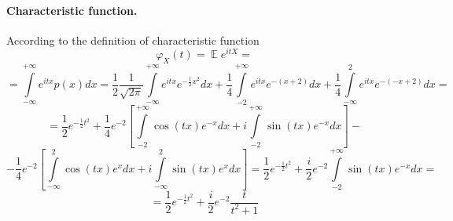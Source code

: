 \documentclass[a4paper, 12pt]{article}
\DeclareMathOperator*{\E}{\mathbb{E}}
\begin{document}
\paragraph{Characteristic function.}
According to the definition of characteristic function
$$
\varphi_X(t) = \E e^{itX} = 
$$
$$
= \int \limits_{- \infty}^{+\infty} e^{itx} p(x) dx = \dfrac{1}{2} \dfrac{1}{\sqrt{2 \pi}} \int \limits_{-\infty}^{+\infty} e^{itx} e^{-\frac{1}{2}x^2} dx + \dfrac{1}{4} \int \limits_{-2}^{+\infty} e^{itx} e^{-(x+2)} dx + \dfrac{1}{4} \int \limits_{-\infty}^{2} e^{itx} e^{-(-x+2)} dx = 
$$
$$
= \dfrac{1}{2} e^{-\frac{1}{2}t^2} + \dfrac{1}{4} e^{-2} \left[ \int \limits_{-2}^{+\infty} \cos(tx) e^{-x}dx + i\int \limits_{-2}^{+\infty} \sin(tx) e^{-x}dx \right] - 
$$
$$
- \dfrac{1}{4} e^{-2} \left[ \int \limits_{-\infty}^{2} \cos(tx) e^{x}dx + i\int \limits_{-\infty}^{2} \sin(tx) e^{x}dx \right] = 
\dfrac{1}{2} e^{-\frac{1}{2}t^2} + \dfrac{i}{2} e^{-2} \int \limits_{-2}^{+\infty} \sin(tx) e^{-x}dx =
$$
$$
= \dfrac{1}{2} e^{-\frac{1}{2}t^2} + \dfrac{i}{2} e^{-2} \dfrac{t}{t^2 + 1}
$$
\end{document}
